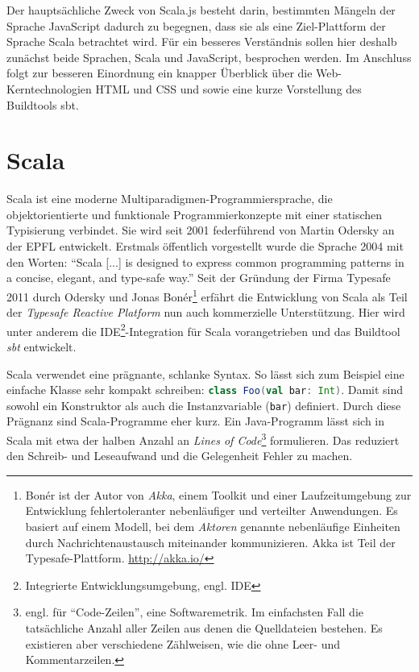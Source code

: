 \documentclass[a4paper, 12pt, hidelinks, listof=totoc, listoftables=totoc, bibliography=totoc]{scrreprt}
\newcommand{\scala}[1]{\lstinline[language=Scala, style=inline]|#1|}
\begin{document}
Der hauptsächliche Zweck von Scala.js besteht darin, bestimmten Mängeln der Sprache JavaScript dadurch zu begegnen, dass sie als eine Ziel-Plattform der Sprache Scala betrachtet wird. Für ein besseres Verständnis sollen hier deshalb zunächst beide Sprachen, Scala und JavaScript, besprochen werden. Im Anschluss folgt zur besseren Einordnung ein knapper Überblick über die Web-Kerntechnologien \ac{HTML} und \ac{CSS} und sowie eine kurze Vorstellung des Buildtools sbt.

\section{Scala}

Scala ist eine moderne Multiparadigmen-Programmiersprache, die objektorientierte und funktionale Programmierkonzepte mit einer statischen Typisierung verbindet. Sie wird seit 2001 federführend von Martin Odersky an der \ac{EPFL} entwickelt. Erstmals öffentlich vorgestellt wurde die Sprache 2004 mit den Worten: "`Scala [...] is designed to express common programming patterns in a concise, elegant, and type-safe way."' \cite{schinz2004.ASP} Seit der Gründung der Firma Typesafe 2011 durch Odersky und Jonas Bonér\footnote{Bonér ist der Autor von \emph{Akka}, einem Toolkit und einer Laufzeitumgebung zur Entwicklung fehlertoleranter nebenläufiger und verteilter Anwendungen. Es basiert auf einem Modell, bei dem \emph{Aktoren} genannte nebenläufige Einheiten durch Nachrichtenaustausch miteinander kommunizieren. Akka ist Teil der Typesafe-Plattform. \url{http://akka.io/}} erfährt die Entwicklung von Scala als Teil der \emph{Typesafe Reactive Platform} nun auch kommerzielle Unterstützung.
Hier wird unter anderem die IDE\footnote{Integrierte Entwicklungsumgebung, engl. \ac{IDE}}-Integration für Scala vorangetrieben und das Buildtool \emph{sbt} entwickelt. \cite{scala-lang2011.CSS} 

Scala verwendet eine prägnante, schlanke Syntax. So lässt sich zum Beispiel eine einfache Klasse sehr kompakt schreiben: \scala{class Foo(val bar: Int)}. Damit sind sowohl ein Konstruktor als auch die Instanzvariable (\scala{bar}) definiert. Durch diese Prägnanz sind Scala-Programme eher kurz. Ein Java-Programm lässt sich in Scala mit etwa der halben Anzahl an \emph{Lines of Code}\footnote{engl. für "`Code-Zeilen"', eine Softwaremetrik. Im einfachsten Fall die tatsächliche Anzahl aller Zeilen aus denen die Quelldateien bestehen. Es existieren aber verschiedene Zählweisen, wie die ohne Leer- und Kommentarzeilen.} formulieren. Das reduziert den Schreib- und Leseaufwand und die Gelegenheit Fehler zu machen.
\end{document}
